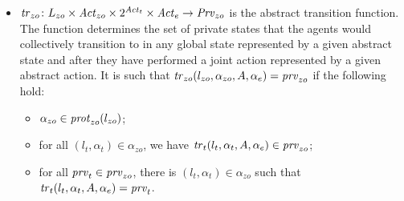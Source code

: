 \begin{definition}
\begin{itemize}[$\bullet$]
    \item $\mathit{tr}_{zo} \colon L_{zo} \times \mathit{Act}_{zo} \times 2^{\mathit{Act}_{t}} 
    \times \mathit{Act}_{e} \rightarrow \mathit{Prv}_{zo}$ is the abstract transition function.
    The function determines the set of private states that the agents would
    collectively transition to in any global state represented by a given
    abstract state and after they have performed a joint action represented by a
    given abstract action. It is such that $\mathit{tr}_{zo}(l_{zo}, \alpha_{zo}, A, \alpha_e)
    = \mathit{prv}_{zo}$ if the following hold:
    \begin{itemize}[\textbf{--}]
    \item $\alpha_{zo} \in \mathit{prot}_{zo}(l_{zo})$; 
    \item for all $(l_t, \alpha_t) \in \alpha_{zo}$, we have
      $\mathit{tr}_{t}(l_t, \alpha_t, A, \alpha_e) \in \mathit{prv}_{zo}$;
    \item for all $\mathit{prv}_{t} \in \mathit{prv}_{zo}$, there is
      $(l_t, \alpha_t) \in \alpha_{zo}$ such that
      $\mathit{tr}_{t}(l_t, \alpha_t, A, \alpha_e) = \mathit{prv}_{t}$.
    \end{itemize}
\end{itemize}
\end{definition}

